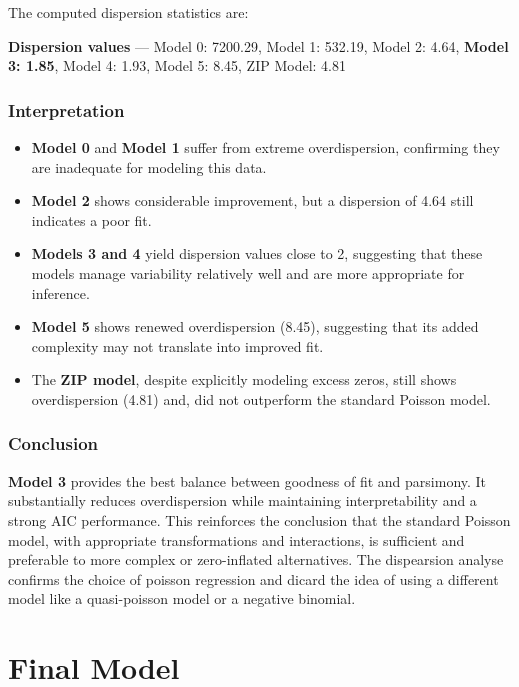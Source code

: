 \documentclass[
  12pt,
]{article}
\providecommand{\tightlist}{%
  \setlength{\itemsep}{0pt}\setlength{\parskip}{0pt}}
\begin{document}
The computed dispersion statistics are:

\textbf{Dispersion values} --- Model 0: 7200.29, Model 1: 532.19, Model
2: 4.64, \textbf{Model 3: 1.85}, Model 4: 1.93, Model 5: 8.45, ZIP
Model: 4.81

\subsubsection{Interpretation}\label{interpretation}

\begin{itemize}
\tightlist
\item
  \textbf{Model 0} and \textbf{Model 1} suffer from extreme
  overdispersion, confirming they are inadequate for modeling this data.
\item
  \textbf{Model 2} shows considerable improvement, but a dispersion of
  4.64 still indicates a poor fit.
\item
  \textbf{Models 3 and 4} yield dispersion values close to 2, suggesting
  that these models manage variability relatively well and are more
  appropriate for inference.
\item
  \textbf{Model 5} shows renewed overdispersion (8.45), suggesting that
  its added complexity may not translate into improved fit.
\item
  The \textbf{ZIP model}, despite explicitly modeling excess zeros,
  still shows overdispersion (4.81) and, did not outperform the standard
  Poisson model.
\end{itemize}

\subsubsection{Conclusion}\label{conclusion}

\textbf{Model 3} provides the best balance between goodness of fit and
parsimony. It substantially reduces overdispersion while maintaining
interpretability and a strong AIC performance. This reinforces the
conclusion that the standard Poisson model, with appropriate
transformations and interactions, is sufficient and preferable to more
complex or zero-inflated alternatives. The dispearsion analyse confirms
the choice of poisson regression and dicard the idea of using a
different model like a quasi-poisson model or a negative binomial.

\section{Final Model}\label{final-model}
\end{document}
